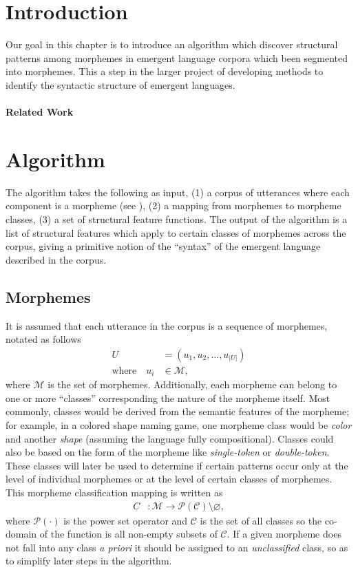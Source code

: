 \section{Introduction}

Our goal in this chapter is to introduce an algorithm which discover structural patterns among morphemes in emergent language corpora which been segmented into morphemes.
This a step in the larger project of developing methods to identify the syntactic structure of emergent languages.


\paragraph{Related Work}
\phantom{}%

\section{Algorithm}

The algorithm takes the following as input,
  (1) a corpus of utterances where each component is a morpheme (see ),
  (2) a mapping from morphemes to morpheme classes,
  (3) a set of structural feature functions.
The output of the algorithm is a list of structural features which apply to certain classes of morphemes across the corpus, giving a primitive notion of the ``syntax'' of the emergent language described in the corpus.


\subsection{Morphemes}
It is assumed that each utterance in the corpus is a sequence of morphemes, notated as follows
\begin{align}
  U &= (u_1, u_2, \dots, u_{|U|}) \\
  \text{where}\quad u_i &\in \mathcal M
  ,
\end{align}
where $\mathcal M$ is the set of morphemes.
Additionally, each morpheme can belong to one or more ``classes'' corresponding the nature of the morpheme itself.
Most commonly, classes would be derived from the semantic features of the morpheme;
  for example, in a colored shape naming game, one morpheme class would be \emph{color} and another \emph{shape} (assuming the language fully compositional).
Classes could also be based on the form of the morpheme like \emph{single-token} or \emph{double-token}.
These classes will later be used to determine if certain patterns occur only at the level of individual morphemes or at the level of certain classes of morphemes.
This morpheme classification mapping is written as
\begin{align}
  C &: \mathcal M \rightarrow \mathcal P(\mathcal C) \setminus \varnothing
  ,
\end{align}
where $\mathcal P(\cdot)$ is the power set operator and $\mathcal C$ is the set of all classes so the co-domain of the function is all non-empty subsets of $\mathcal C$.
If a given morpheme does not fall into any class \emph{a priori} it should be assigned to an \emph{unclassified} class, so as to simplify later steps in the algorithm.

